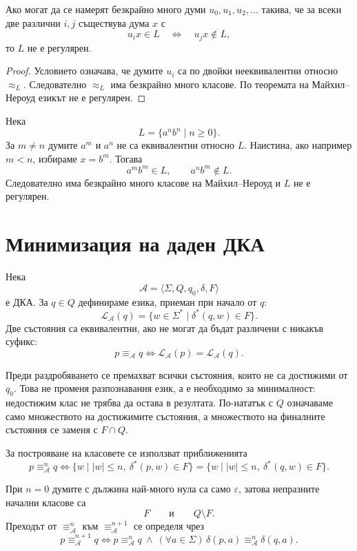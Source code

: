 \begin{cor}
Ако могат да се намерят безкрайно много думи $u_0,u_1,u_2,\ldots$ такива, че за всеки две различни $i,j$ съществува дума $x$ с
\[
u_ix\in L
\quad\Longleftrightarrow\quad
u_jx\notin L,
\]
то $L$ не е регулярен.
\end{cor}

\begin{proof}
Условието означава, че думите $u_i$ са по двойки нееквивалентни относно $\approx_L$. Следователно $\approx_L$ има безкрайно много класове. По теоремата на Майхил--Нероуд езикът не е регулярен.
\end{proof}

\begin{example}
Нека
\[
L=\{a^nb^n\mid n\geq 0\}.
\]
За $m\ne n$ думите $a^m$ и $a^n$ не са еквивалентни относно $L$. Наистина, ако например $m<n$, избираме $x=b^m$. Тогава
\[
a^mb^m\in L,
\qquad
a^nb^m\notin L.
\]
Следователно има безкрайно много класове на Майхил--Нероуд и $L$ не е регулярен.
\end{example}

\section{Минимизация на даден ДКА}\label{s:4.8}

Нека
\[
\mathcal A=\langle\Sigma,Q,q_0,\delta,F\rangle
\]
е ДКА. За $q\in Q$ дефинираме езика, приеман при начало от $q$:
\[
\mathcal L_{\mathcal A}(q)=
\{w\in\Sigma^*\mid\delta^*(q,w)\in F\}.
\]
Две състояния са еквивалентни, ако не могат да бъдат различени с никакъв суфикс:
\[
p\equiv_{\mathcal A}q
\Longleftrightarrow
\mathcal L_{\mathcal A}(p)=\mathcal L_{\mathcal A}(q).
\]

Преди раздробяването се премахват всички състояния, които не са достижими от $q_0$. Това не променя разпознавания език, а е необходимо за минималност: недостижим клас не трябва да остава в резултата. По-нататък с $Q$ означаваме само множеството на достижимите състояния, а множеството на финалните състояния се заменя с $F\cap Q$.

За построяване на класовете се използват приближенията
\[
p\equiv_{\mathcal A}^n q
\Longleftrightarrow
\{w\mid |w|\leq n,\ \delta^*(p,w)\in F\}
=
\{w\mid |w|\leq n,\ \delta^*(q,w)\in F\}.
\]

При $n=0$ думите с дължина най-много нула са само $\varepsilon$, затова непразните начални класове са
\[
F
\qquad\text{и}\qquad
Q\setminus F.
\]
Преходът от $\equiv_{\mathcal A}^n$ към $\equiv_{\mathcal A}^{n+1}$ се определя чрез
\[
p\equiv_{\mathcal A}^{n+1}q
\Longleftrightarrow
p\equiv_{\mathcal A}^{n}q
\ \land\
(\forall a\in\Sigma)\,
\delta(p,a)\equiv_{\mathcal A}^{n}\delta(q,a).
\]

